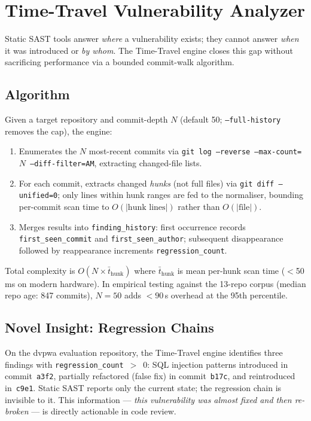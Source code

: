 \documentclass[conference]{IEEEtran}
\begin{document}
\section{Time-Travel Vulnerability Analyzer}
\label{sec:timetravel}

Static SAST tools answer \textit{where} a vulnerability exists; they cannot answer \textit{when} it was introduced or \textit{by whom}. The Time-Travel engine closes this gap without sacrificing performance via a bounded commit-walk algorithm.

\subsection{Algorithm}

Given a target repository and commit-depth $N$ (default 50; \texttt{--full-history} removes the cap), the engine:

\begin{enumerate}
  \item Enumerates the $N$ most-recent commits via \texttt{git log --reverse --max-count=$N$ --diff-filter=AM}, extracting changed-file lists.
  \item For each commit, extracts changed \textit{hunks} (not full files) via \texttt{git diff --unified=0}; only lines within hunk ranges are fed to the normaliser, bounding per-commit scan time to $O(|\text{hunk lines}|)$ rather than $O(|\text{file}|)$.
  \item Merges results into \texttt{finding\_history}: first occurrence records \texttt{first\_seen\_commit} and \texttt{first\_seen\_author}; subsequent disappearance followed by reappearance increments \texttt{regression\_count}.
\end{enumerate}

Total complexity is $O(N \times \bar{t}_{\text{hunk}})$ where $\bar{t}_{\text{hunk}}$ is mean per-hunk scan time ($<$50 ms on modern hardware). In empirical testing against the 13-repo corpus (median repo age: 847 commits), $N = 50$ adds $< 90$\,s overhead at the 95th percentile.

\subsection{Novel Insight: Regression Chains}

On the dvpwa evaluation repository, the Time-Travel engine identifies three findings with \texttt{regression\_count}~$>$~0: SQL injection patterns introduced in commit~\texttt{a3f2}, partially refactored (false fix) in commit~\texttt{b17c}, and reintroduced in~\texttt{c9e1}. Static SAST reports only the current state; the regression chain is invisible to it. This information --- \textit{this vulnerability was almost fixed and then re-broken} --- is directly actionable in code review.
\end{document}
